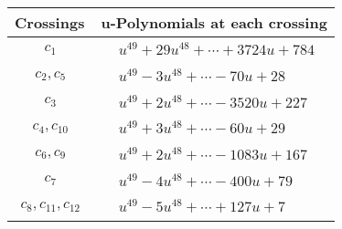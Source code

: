 \documentclass[1p]{elsarticle_modified}
\theoremstyle{definition}
\begin{document}
\begin{tabular}{m{50pt}|m{274pt}}
Crossings & \hspace{64pt}u-Polynomials at each crossing \\
\hline $$\begin{aligned}c_{1}\end{aligned}$$&$\begin{aligned}
&u^{49}+29 u^{48}+\cdots+3724 u+784
\end{aligned}$\\
\hline $$\begin{aligned}c_{2},c_{5}\end{aligned}$$&$\begin{aligned}
&u^{49}-3 u^{48}+\cdots-70 u+28
\end{aligned}$\\
\hline $$\begin{aligned}c_{3}\end{aligned}$$&$\begin{aligned}
&u^{49}+2 u^{48}+\cdots-3520 u+227
\end{aligned}$\\
\hline $$\begin{aligned}c_{4},c_{10}\end{aligned}$$&$\begin{aligned}
&u^{49}+3 u^{48}+\cdots-60 u+29
\end{aligned}$\\
\hline $$\begin{aligned}c_{6},c_{9}\end{aligned}$$&$\begin{aligned}
&u^{49}+2 u^{48}+\cdots-1083 u+167
\end{aligned}$\\
\hline $$\begin{aligned}c_{7}\end{aligned}$$&$\begin{aligned}
&u^{49}-4 u^{48}+\cdots-400 u+79
\end{aligned}$\\
\hline $$\begin{aligned}c_{8},c_{11},c_{12}\end{aligned}$$&$\begin{aligned}
&u^{49}-5 u^{48}+\cdots+127 u+7
\end{aligned}$\\
\hline
\end{tabular}\\~\\
\newpage\renewcommand{\arraystretch}{1}
\end{document}
